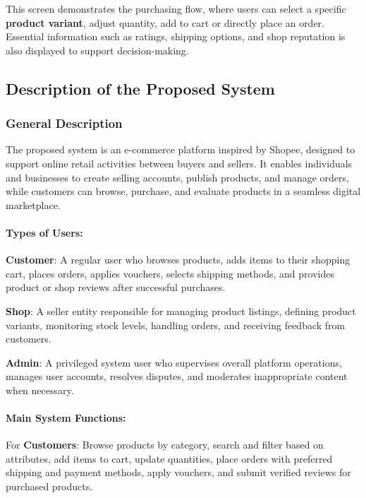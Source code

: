 \noindent
This screen demonstrates the purchasing flow, where users can select a specific \textbf{product variant}, adjust quantity, add to cart or directly place an order. Essential information such as ratings, shipping options, and shop reputation is also displayed to support decision-making.

\subsection{Description of the Proposed System}

\subsubsection{General Description}

The proposed system is an e-commerce platform inspired by Shopee, designed to support online retail activities between buyers and sellers. It enables individuals and businesses to create selling accounts, publish products, and manage orders, while customers can browse, purchase, and evaluate products in a seamless digital marketplace.

\paragraph{Types of Users:}

\textbf{Customer}: A regular user who browses products, adds items to their shopping cart, places orders, applies vouchers, selects shipping methods, and provides product or shop reviews after successful purchases.

\textbf{Shop}: A seller entity responsible for managing product listings, defining product variants, monitoring stock levels, handling orders, and receiving feedback from customers.

\textbf{Admin}: A privileged system user who supervises overall platform operations, manages user accounts, resolves disputes, and moderates inappropriate content when necessary.
\paragraph{Main System Functions:}

For \textbf{Customers}: Browse products by category, search and filter based on attributes, add items to cart, update quantities, place orders with preferred shipping and payment methods, apply vouchers, and submit verified reviews for purchased products.

